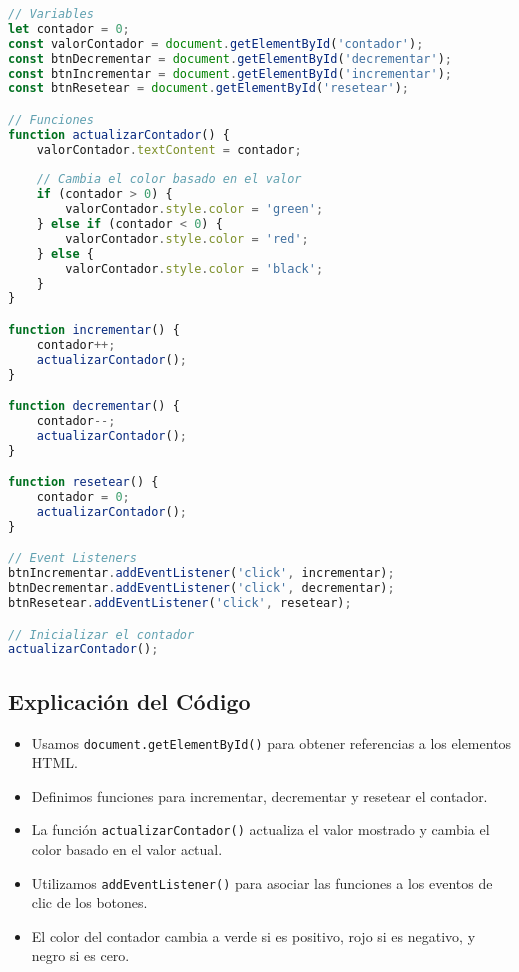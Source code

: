 \documentclass{book}
\begin{document}
\begin{lstlisting}[language=JavaScript]
// Variables
let contador = 0;
const valorContador = document.getElementById('contador');
const btnDecrementar = document.getElementById('decrementar');
const btnIncrementar = document.getElementById('incrementar');
const btnResetear = document.getElementById('resetear');

// Funciones
function actualizarContador() {
    valorContador.textContent = contador;
    
    // Cambia el color basado en el valor
    if (contador > 0) {
        valorContador.style.color = 'green';
    } else if (contador < 0) {
        valorContador.style.color = 'red';
    } else {
        valorContador.style.color = 'black';
    }
}

function incrementar() {
    contador++;
    actualizarContador();
}

function decrementar() {
    contador--;
    actualizarContador();
}

function resetear() {
    contador = 0;
    actualizarContador();
}

// Event Listeners
btnIncrementar.addEventListener('click', incrementar);
btnDecrementar.addEventListener('click', decrementar);
btnResetear.addEventListener('click', resetear);

// Inicializar el contador
actualizarContador();
\end{lstlisting}

\subsection{Explicación del Código}

\begin{itemize}
    \item Usamos \texttt{document.getElementById()} para obtener referencias a los elementos HTML.
    \item Definimos funciones para incrementar, decrementar y resetear el contador.
    \item La función \texttt{actualizarContador()} actualiza el valor mostrado y cambia el color basado en el valor actual.
    \item Utilizamos \texttt{addEventListener()} para asociar las funciones a los eventos de clic de los botones.
    \item El color del contador cambia a verde si es positivo, rojo si es negativo, y negro si es cero.
\end{itemize}
\end{document}
